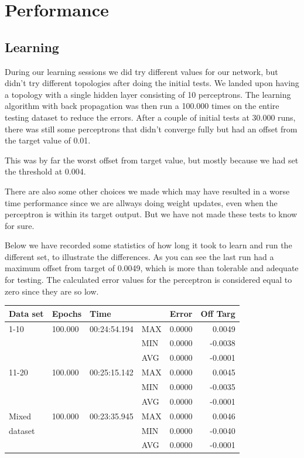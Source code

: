 \chapter{Performance}

\section{Learning}
During our learning sessions we did try different values for our network, but
didn't try different topologies after doing the initial tests. We landed upon
having a topology with a single hidden layer consisting of 10 perceptrons. The
learning algorithm with back propagation was then run a 100.000 times on the
entire testing dataset to reduce the errors. After a couple of initial tests at
30.000 runs, there was still some perceptrons that didn't converge fully but had
an offset from the target value of 0.01.

This was by far the worst offset from target value, but mostly because we had
set the threshold at 0.004.

There are also some other choices we made which may have resulted in a worse
time performance since we are allways doing weight updates, even when the
perceptron is within its target output.  But we have not made these tests to
know for sure.

Below we have recorded some statistics of how long it took to learn and run the
different set, to illustrate the differences. As you can see the last run had a
maximum offset from target of 0.0049, which is more than tolerable and adequate
for testing.  The calculated error values for the perceptron is considered equal
to zero since they are so low.

\begin{longtable}{ p{} p{} p{} 
									 p{} c r }
\textbf{Data set} & \textbf{Epochs}		& \textbf{Time} 			& & 
									  \textbf{Error}		& \textbf{Off Targ} \\\hline 
1-10	& 100.000 & 00:24:54.194	& MAX 	& 0.0000	& 0.0049 	\\
			& 				& 							& MIN 	& 0.0000	& -0.0038	\\
			& 				& 							& AVG 	& 0.0000	& -0.0001	\\
11-20	& 100.000 & 00:25:15.142	& MAX 	& 0.0000	& 0.0045	\\
			& 				& 							& MIN 	& 0.0000	& -0.0035	\\
			& 				& 							& AVG 	& 0.0000	& -0.0001	\\
Mixed & 100.000 & 00:23:35.945	& MAX 	& 0.0000	& 0.0046	\\
dataset	& 			& 							& MIN 	& 0.0000	& -0.0040	\\
				& 			& 							& AVG 	& 0.0000	& -0.0001	\\
\end{longtable}


